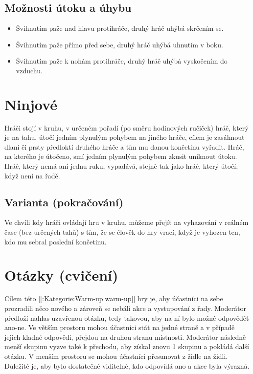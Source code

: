 \subsection{ Možnosti útoku a úhybu } \begin{itemize}
\item  Švihnutím paže nad hlavu protihráče, druhý hráč uhýbá skrčením se.
\item  Švihnutím paže přímo před sebe, druhý hráč uhýbá uhnutím v boku.
\item  Švihnutím paže k nohám protihráče, druhý hráč uhýbá vyskočením do vzduchu.
\end{itemize}
 
 
 
\needspace{5cm} \section{Ninjové} \label{ninjové} Hráči stojí v kruhu, v určeném pořadí (po směru hodinových ručiček) hráč, který je na tahu, útočí jedním plynulým pohybem na jiného hráče, cílem je zasáhnout dlaní či prsty předloktí druhého hráče a tím mu danou končetinu vyřadit. Hráč, na kterého je útočeno, smí jedním plynulým pohybem zkusit uniknout útoku. 
Hráč, který nemá ani jednu ruku, vypadává, stejně tak jako hráč, který útočí, když není na řadě. 
 
\subsection{Varianta (pokračování) } Ve chvíli kdy hráči ovládají hru v kruhu, můžeme přejít na vyhazování v reálném čase (bez určených tahů) s tím, že se člověk do hry vrací, když je vyhozen ten, kdo mu sebral poslední končetinu.  
 
 
\needspace{5cm} \section{Otázky (cvičení)} \label{otázky (cvičení)} Cílem této [[:Kategorie:Warm-up|warm-up]] hry je, aby účastníci na sebe prozradili něco nového a zároveň se nebáli akce a vystupování z řady. Moderátor předloží nahlas uzavřenou otázku, tedy takovou, aby na ní bylo možné odpovědět ano-ne. Ve větším prostoru mohou účastníci stát na jedné straně a v případě jejich kladné odpovědi, přejdou na druhou stranu místnosti. Moderátor následně menší skupinu vyzve také k přechodu, aby získal znovu 1 skupinu a pokládá další otázku. V menším prostoru se mohou účastníci přesunovat z židle na židli. Důležité je, aby bylo dostatečně viditelné, kdo odpovídá ano a akce byla výrazná. 
 
